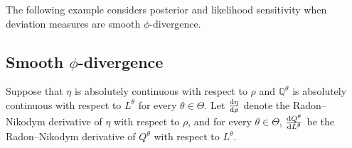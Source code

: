 \documentclass[11pt,reqno,letter]{amsart}
\theoremstyle{plain}
\theoremstyle{definition}
\numberwithin{equation}{section}
\numberwithin{theorem}{section}
\numberwithin{table}{section}
\numberwithin{figure}{section}
\begin{document}
The following example considers posterior and likelihood sensitivity when deviation measures are smooth $\phi$-divergence.

\subsection{Smooth $\phi$-divergence}
 \label{eg:phi_Bayes}
 

Suppose that $\eta$ is absolutely continuous with respect to $\rho$ and  ${\mathbb Q}^\theta$ is absolutely continuous with respect to $L^\theta$ for every $\theta\in\Theta$. Let $\frac{{\rm d} \eta}{{\rm d}\rho}$ denote the Radon--Nikodym derivative of $\eta$ with respect to $\rho$, and for every $\theta\in\Theta$, $\frac{{\rm d}Q^\theta}{{\rm d}L^\theta}$ be the Radon--Nikodym derivative of $Q^{\theta}$ with respect to $L^\theta$.
\end{document}
